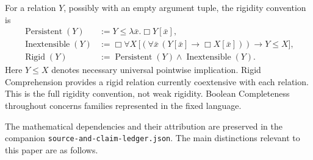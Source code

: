 \documentclass[11pt]{article}
\begin{document}
For a relation $Y$, possibly with an empty argument tuple, the rigidity convention is
\begin{align*}
 \operatorname{Persistent}(Y)&:=Y\le\lambda\bar x.\Box Y[\bar x],\\
 \operatorname{Inextensible}(Y)&:=\Box\forall X\,
 \bigl[(\forall\bar x\,(Y[\bar x]\to\Box X[\bar x]))\to Y\le X\bigr],\\
 \operatorname{Rigid}(Y)&:=\operatorname{Persistent}(Y)\land
 \operatorname{Inextensible}(Y).
\end{align*}
Here $Y\le X$ denotes necessary universal pointwise implication. Rigid Comprehension provides a rigid relation currently coextensive with each relation. This is the full rigidity convention, not weak rigidity. Boolean Completeness throughout concerns families represented in the fixed language.

The mathematical dependencies and their attribution are preserved in the companion \texttt{source-and-claim-ledger.json}. The main distinctions relevant to this paper are as follows.
\end{document}
